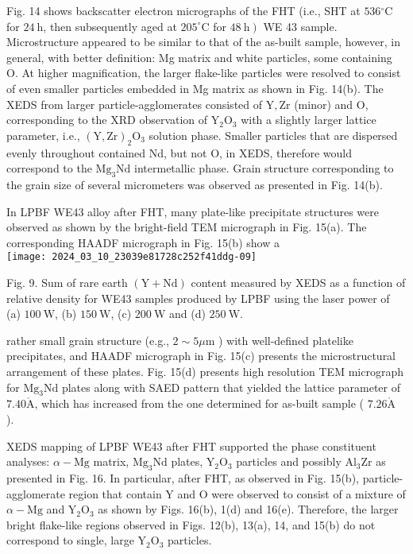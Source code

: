 \documentclass[10pt]{article}
\def\AA{\mathring{\mathrm{A}}}
\begin{document}
Fig. 14 shows backscatter electron micrographs of the FHT (i.e., SHT at $536{ }^{\circ} \mathrm{C}$ for $24 \mathrm{~h}$, then subsequently aged at $205^{\circ} \mathrm{C}$ for $\left.48 \mathrm{~h}\right)$ WE 43 sample. Microstructure appeared to be similar to that of the as-built sample, however, in general, with better definition: Mg matrix and white particles, some containing O. At higher magnification, the larger flake-like particles were resolved to consist of even smaller particles embedded in Mg matrix as shown in Fig. 14(b). The XEDS from larger particle-agglomerates consisted of $\mathrm{Y}, \mathrm{Zr}$ (minor) and $\mathrm{O}$, corresponding to the XRD observation of $\mathrm{Y}_{2} \mathrm{O}_{3}$ with a slightly larger lattice parameter, i.e., $(\mathrm{Y}, \mathrm{Zr})_{2} \mathrm{O}_{3}$ solution phase. Smaller particles that are dispersed evenly throughout contained Nd, but not O, in XEDS, therefore would correspond to the $\mathrm{Mg}_{3} \mathrm{Nd}$ intermetallic phase. Grain structure corresponding to the grain size of several micrometers was observed as presented in Fig. 14(b).

In LPBF WE43 alloy after FHT, many plate-like precipitate structures were observed as shown by the bright-field TEM micrograph in Fig. 15(a). The corresponding HAADF micrograph in Fig. 15(b) show a\\
\texttt{[image: 2024\_03\_10\_23039e81728c252f41ddg-09]}

Fig. 9. Sum of rare earth $(\mathrm{Y}+\mathrm{Nd})$ content measured by XEDS as a function of relative density for WE43 samples produced by LPBF using the laser power of (a) $100 \mathrm{~W}$, (b) $150 \mathrm{~W}$, (c) $200 \mathrm{~W}$ and (d) $250 \mathrm{~W}$.

rather small grain structure (e.g., $2 \sim 5 \mu \mathrm{m}$ ) with well-defined platelike precipitates, and HAADF micrograph in Fig. 15(c) presents the microstructural arrangement of these plates. Fig. 15(d) presents high resolution TEM micrograph for $\mathrm{Mg}_{3} \mathrm{Nd}$ plates along with SAED pattern that yielded the lattice parameter of $7.40 \AA$, which has increased from the one determined for as-built sample ( $7.26 \AA$ ).

XEDS mapping of LPBF WE43 after FHT supported the phase constituent analyses: $\alpha-\mathrm{Mg}$ matrix, $\mathrm{Mg}_{3} \mathrm{Nd}$ plates, $\mathrm{Y}_{2} \mathrm{O}_{3}$ particles and possibly $\mathrm{Al}_{3} \mathrm{Zr}$ as presented in Fig. 16. In particular, after FHT, as observed in Fig. 15(b), particle-agglomerate region that contain $\mathrm{Y}$ and $\mathrm{O}$ were observed to consist of a mixture of $\alpha-\mathrm{Mg}$ and $\mathrm{Y}_{2} \mathrm{O}_{3}$ as shown by Figs. 16(b), 1(d) and 16(e). Therefore, the larger bright flake-like regions observed in Figs. 12(b), 13(a), 14, and 15(b) do not correspond to single, large $\mathrm{Y}_{2} \mathrm{O}_{3}$ particles.
\end{document}
